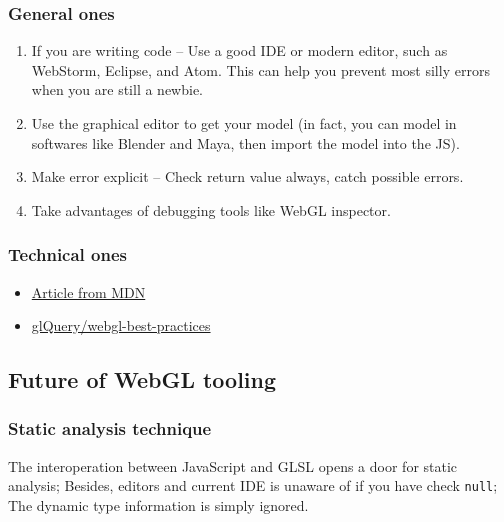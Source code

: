 \documentclass[]{article}
\begin{document}
\subsubsection{General ones}\label{general-ones}

\begin{enumerate}
\def\labelenumi{\arabic{enumi}.}
\itemsep1pt\parskip0pt
\item
  If you are writing code -- Use a good IDE or modern editor, such as
  WebStorm, Eclipse, and Atom. This can help you prevent most silly
  errors when you are still a newbie.
\item
  Use the graphical editor to get your model (in fact, you can model in
  softwares like Blender and Maya, then import the model into the JS).
\item
  Make error explicit -- Check return value always, catch possible
  errors.
\item
  Take advantages of debugging tools like WebGL inspector.
\end{enumerate}

\subsubsection{Technical ones}\label{technical-ones}

\begin{itemize}
\itemsep1pt\parskip0pt
\item
  \href{https://developer.mozilla.org/en-US/docs/Web/API/WebGL_API/WebGL_best_practices}{Article
  from MDN}
\item
  \href{https://github.com/glQuery/webgl-best-practices}{glQuery/webgl-best-practices}
\end{itemize}

\subsection{Future of WebGL tooling}\label{future-of-webgl-tooling}

\subsubsection{Static analysis
technique}\label{static-analysis-technique}

The interoperation between JavaScript and GLSL opens a door for static
analysis; Besides, editors and current IDE is unaware of if you have
check \texttt{null}; The dynamic type information is simply ignored.
\end{document}
